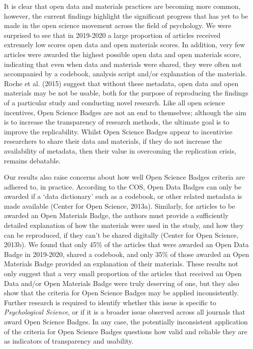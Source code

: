 \documentclass[
  english,
  man,floatsintext]{apa6}
\begin{document}
It is clear that open data and materials practices are becoming more common, however, the current findings highlight the significant progress that has yet to be made in the open science movement across the field of psychology. We were surprised to see that in 2019-2020 a large proportion of articles received extremely low scores open data and open materials scores. In addition, very few articles were awarded the highest possible open data and open materials score, indicating that even when data and materials were shared, they were often not accompanied by a codebook, analysis script and/or explanation of the materials. Roche et al. (2015) suggest that without these metadata, open data and open materials may be not be usable, both for the purpose of reproducing the findings of a particular study and conducting novel research. Like all open science incentives, Open Science Badges are not an end to themselves; although the aim is to increase the transparency of research methods, the ultimate goal is to improve the replicability. Whilst Open Science Badges appear to incentivise researchers to share their data and materials, if they do not increase the availability of metadata, then their value in overcoming the replication crisis, remains debatable.

Our results also raise concerns about how well Open Science Badges criteria are adhered to, in practice. According to the COS, Open Data Badges can only be awarded if a `data dictionary' such as a codebook, or other related metadata is made available (Center for Open Science, 2013a). Similarly, for articles to be awarded an Open Materials Badge, the authors must provide a sufficiently detailed explanation of how the materials were used in the study, and how they can be reproduced, if they can't be shared digitally (Center for Open Science, 2013b). We found that only 45\% of the articles that were awarded an Open Data Badge in 2019-2020, shared a codebook, and only 35\% of those awarded an Open Materials Badge provided an explanation of their materials. These results not only suggest that a very small proportion of the articles that received an Open Data and/or Open Materials Badge were truly deserving of one, but they also show that the criteria for Open Science Badges may be applied inconsistently. Further research is required to identify whether this issue is specific to \emph{Psychological Science}, or if it is a broader issue observed across all journals that award Open Science Badges. In any case, the potentially inconsistent application of the criteria for Open Science Badges questions how valid and reliable they are as indicators of transparency and usability.
\end{document}
